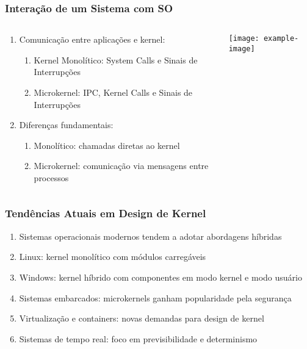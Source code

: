 \documentclass{beamer}
\begin{document}
\begin{frame}[fragile]
\frametitle{Interação de um Sistema com SO}

\begin{columns}
    \begin{column}{0.5\textwidth}
        \begin{enumerate}
            \item Comunicação entre aplicações e kernel:
            \begin{enumerate}
                \item Kernel Monolítico: System Calls e Sinais de Interrupções
                \item Microkernel: IPC, Kernel Calls e Sinais de Interrupções
            \end{enumerate}
            \item Diferenças fundamentais:
            \begin{enumerate}
                \item Monolítico: chamadas diretas ao kernel
                \item Microkernel: comunicação via mensagens entre processos
            \end{enumerate}
        \end{enumerate}
    \end{column}
    
    \begin{column}{0.5\textwidth}
        \begin{center}
            \texttt{[image: example-image]}
        \end{center}
    \end{column}
\end{columns}
\end{frame}

\begin{frame}[fragile]
\frametitle{Tendências Atuais em Design de Kernel}

\begin{enumerate}
    \vfill \item Sistemas operacionais modernos tendem a adotar abordagens híbridas
    \vfill \item Linux: kernel monolítico com módulos carregáveis
    \vfill \item Windows: kernel híbrido com componentes em modo kernel e modo usuário
    \vfill \item Sistemas embarcados: microkernels ganham popularidade pela segurança
    \vfill \item Virtualização e containers: novas demandas para design de kernel
    \vfill \item Sistemas de tempo real: foco em previsibilidade e determinismo
\end{enumerate}
\end{frame}
\end{document}
